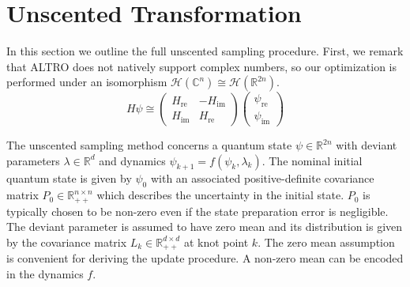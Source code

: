 \section{Unscented Transformation}
In this section we outline the full unscented sampling procedure.
First, we remark that ALTRO does not natively support complex numbers, so our optimization
is performed under an isomorphism $\mathcal{H}(\mathbb{C}^{n}) \cong \mathcal{H}(\mathbb{R}^{2n})$.
\begin{equation}
  H \psi \cong \begin{pmatrix} H_{\textrm{re}} & -H_{\textrm{im}} \\ H_{\textrm{im}} & H_{\textrm{re}}\end{pmatrix}
  \begin{pmatrix} \psi_{\textrm{re}} \\ \psi_{\textrm{im}}\end{pmatrix}
\end{equation}

The unscented sampling method concerns a quantum state $\psi \in \mathbb{R}^{2n}$ with
deviant parameters $\lambda \in \mathbb{R}^{d}$ and dynamics $\psi_{k + 1} = f(\psi_{k}, \lambda_{k})$.
The nominal initial quantum state is given by $\psi_{0}$ with an associated
positive-definite covariance matrix $P_{0} \in \mathbb{R}_{++}^{n \times n}$
which describes the uncertainty in the initial state.
$P_{0}$ is typically chosen to be non-zero even if the state preparation error is negligible.
The deviant parameter
is assumed to have zero mean and its distribution is given by the covariance matrix
$L_{k} \in \mathbb{R}_{++}^{d \times d}$ at knot point $k$. The zero mean assumption
is convenient for deriving the update procedure. A non-zero mean can be encoded
in the dynamics $f$.

